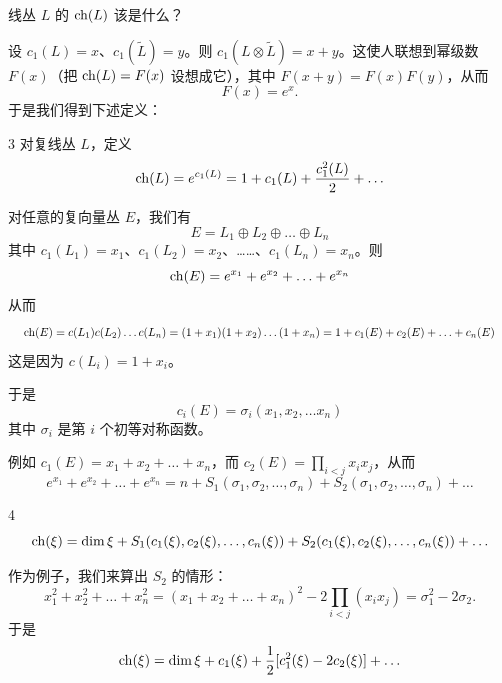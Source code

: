 线丛 $L$ 的 $\operatorname{ch}(L)$ 该是什么？

设 $c_1(L) = x$、$c_1(\tilde L) = y$。则 $c_1(L\otimes\tilde L) = x+y$。这使人联想到幂级数 $F(x)$（把 $\operatorname{ch}(L) = F(x)$ 设想成它），其中 $F(x+y) = F(x)F(y)$，从而
\[ F(x) = e^x. \]
于是我们得到下述定义：

\begin{defn}{3}
对复线丛 $L$，定义
\[ \operatorname{ch}(L) = e^{c_1(L)} = 1+c_1(L)+\frac{c_1^2(L)}{2}+\ldots \]
\end{defn}

对任意的复向量丛 $E$，我们有
\[ E = L_1\oplus L_2\oplus\ldots\oplus L_n \]
其中 $c_1(L_1) = x_1$、$c_1(L_2) = x_2$、……、$c_1(L_n) = x_n$。则
\[ \operatorname{ch}(E) = e^{x_1}+e^{x_2}+\ldots+e^{x_n} \]
从而
\[ \resizebox{0.98\textwidth}{!}{$\displaystyle \ch(E) = c(L_1)c(L_2)\ldots c(L_n) = (1+x_1)(1+x_2)\ldots(1+x_n) = 1+c_1(E)+c_2(E)+\ldots+c_n(E)$} \]
这是因为 $c(L_i) = 1+x_i$。

于是
\[ c_i(E) = \sigma_i(x_1,x_2,\ldots x_n) \]
其中 $\sigma_i$ 是第 $i$ 个初等对称函数。

例如 $c_1(E) = x_1+x_2+\ldots+x_n$，而 $c_2(E) = \prod_{i<j}x_ix_j$，从而
\[ e^{x_1}+e^{x_2}+\ldots+e^{x_n} = n+S_1(\sigma_1,\sigma_2,\ldots,\sigma_n)+S_2(\sigma_1,\sigma_2,\ldots,\sigma_n)+\ldots \]

\begin{defn}{4}
\[ \operatorname{ch}(\xi) = \dim\xi + S_1(c_1(\xi),c_2(\xi),\ldots,c_n(\xi))+S_2(c_1(\xi),c_2(\xi),\ldots,c_n(\xi))+\ldots \]
\end{defn}

作为例子，我们来算出 $S_2$ 的情形：
\[ x_1^2+x_2^2+\ldots+x_n^2 = (x_1+x_2+\ldots+x_n)^2-2\prod_{i<j}(x_ix_j) = \sigma_1^2-2\sigma_2. \]
于是
\[ \operatorname{ch}(\xi) = \dim\xi+c_1(\xi)+\frac{1}{2}[c_1^2(\xi)-2c_2(\xi)]+\ldots \]

